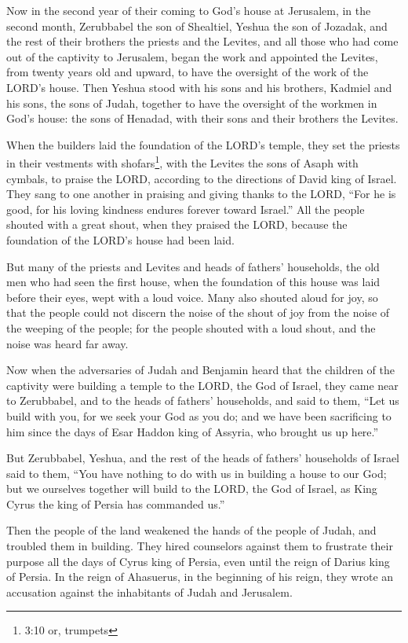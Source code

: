 \myverse{}Now in the second year of their coming to God’s house at Jerusalem,
in the second month, Zerubbabel the son of Shealtiel, Yeshua the son of Jozadak, and the rest of their
brothers the priests and the Levites, and all those who had come out of the captivity to Jerusalem, began
the work and appointed the Levites, from twenty years old and upward, to have the oversight of the work
of the LORD’s house.
\myverse{}Then Yeshua stood with his sons and his brothers, Kadmiel and his sons, the
sons of Judah, together to have the oversight of the workmen in God’s house: the sons of Henadad, with
their sons and their brothers the Levites.

\myverse{}When the builders laid the foundation of the LORD’s temple, they
set the priests in their vestments with shofars\footnote{3:10 or, trumpets}, with the Levites the sons
of Asaph with cymbals, to praise the LORD, according to the directions of David king of Israel.
\myverse{}They sang to one another in praising and giving thanks to the LORD, “For he
is good, for his loving kindness endures forever toward Israel.” All the people shouted with a great shout,
when they praised the LORD, because the foundation of the LORD’s house had been laid.

\myverse{}But many of the priests and Levites and heads of fathers’ households,
the old men who had seen the first house, when the foundation of this house was laid before their eyes,
wept with a loud voice. Many also shouted aloud for joy,
\myverse{}so that the people could not discern the noise of the shout of joy from the
noise of the weeping of the people; for the people shouted with a loud shout, and the noise was heard
far away.


\mychapter{} \myverse*{}Now when the adversaries of Judah and Benjamin heard that the children
of the captivity were building a temple to the LORD, the God of Israel,
\myverse{}they came near to Zerubbabel, and to the heads of fathers’ households, and said
to them, “Let us build with you, for we seek your God as you do; and we have been sacrificing to him since
the days of Esar Haddon king of Assyria, who brought us up here.”

\myverse{}But Zerubbabel, Yeshua, and the rest of the heads of fathers’ households
of Israel said to them, “You have nothing to do with us in building a house to our God; but we ourselves
together will build to the LORD, the God of Israel, as King Cyrus the king of Persia has commanded us.”

\myverse{}Then the people of the land weakened the hands of the people of
Judah, and troubled them in building.
\myverse{}They hired counselors against them to frustrate their purpose all the days of
Cyrus king of Persia, even until the reign of Darius king of Persia.
\myverse{}In the reign of Ahasuerus, in the beginning of his reign, they wrote an accusation
against the inhabitants of Judah and Jerusalem.

